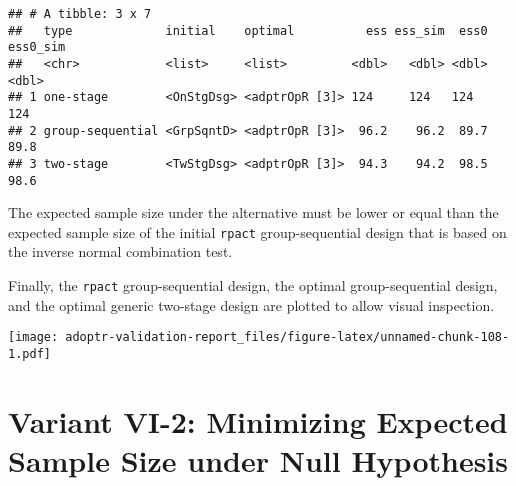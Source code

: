 \documentclass[
]{book}
\newenvironment{Shaded}{\begin{snugshade}}{\end{snugshade}}
\newcommand{\DecValTok}[1]{\textcolor[rgb]{0.00,0.00,0.81}{#1}}
\newcommand{\FunctionTok}[1]{\textcolor[rgb]{0.00,0.00,0.00}{#1}}
\newcommand{\NormalTok}[1]{#1}
\newcommand{\SpecialCharTok}[1]{\textcolor[rgb]{0.00,0.00,0.00}{#1}}
\newcommand{\StringTok}[1]{\textcolor[rgb]{0.31,0.60,0.02}{#1}}
\begin{document}
\begin{verbatim}
## # A tibble: 3 x 7
##   type             initial    optimal          ess ess_sim  ess0 ess0_sim
##   <chr>            <list>     <list>         <dbl>   <dbl> <dbl>    <dbl>
## 1 one-stage        <OnStgDsg> <adptrOpR [3]> 124     124   124      124  
## 2 group-sequential <GrpSqntD> <adptrOpR [3]>  96.2    96.2  89.7     89.8
## 3 two-stage        <TwStgDsg> <adptrOpR [3]>  94.3    94.2  98.5     98.6
\end{verbatim}

The expected sample size under the alternative must be lower or equal than
the expected sample size of the initial \texttt{rpact} group-sequential design that
is based on the inverse normal combination test.

\begin{Shaded}
\end{Shaded}

Finally, the \texttt{rpact} group-sequential design,
the optimal group-sequential design, and the optimal generic two-stage design
are plotted to allow visual inspection.

\texttt{[image: adoptr-validation-report\_files/figure-latex/unnamed-chunk-108-1.pdf]}

\hypertarget{variantVI_2}{%
\section{Variant VI-2: Minimizing Expected Sample Size under Null Hypothesis}\label{variantVI_2}}
\end{document}
